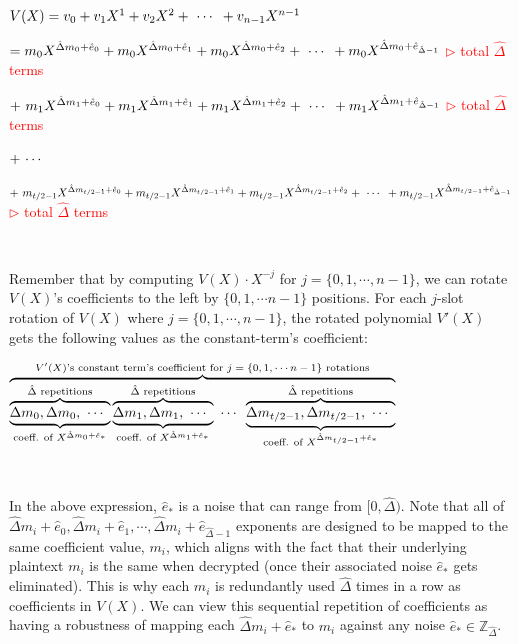 $ $

$V(X) = v_0 + v_1X^1 + v_2X^2 + \text{ } \text{$\cdots$} \text{ } + v_{n-1}X^{n-1}$

\text{ } $= m_0X^{\hat{\Delta} m_0 + \hat{e}_0} + m_0X^{\hat{\Delta} m_0 + \hat{e}_1} + m_0X^{\hat{\Delta} m_0 + \hat{e}_2} + \text{ } \text{$\cdots$} \text{ } +  m_0X^{\hat{\Delta} m_0 + \hat{e}_{\hat{\Delta} - 1}}$ \textcolor{red}{ $\rhd$ total $\hat{\Delta}$ terms}

\text{ } $ + \text{ } m_1X^{\hat{\Delta} m_1 + \hat{e}_0} + m_1X^{\hat{\Delta} m_1 + \hat{e}_1} + m_1X^{\hat{\Delta} m_1 + \hat{e}_2} + \text{ } \text{$\cdots$} \text{ } + m_1X^{\hat{\Delta} m_1 + \hat{e}_{\hat{\Delta} - 1}}$ \textcolor{red}{ $\rhd$ total $\hat{\Delta}$ terms}

\text{ } $ + \text{ } \text{$\cdots$} \text{ } $

\text{ } $ + \text{ } m_{t/2 - 1}X^{\hat{\Delta} m_{t/2 - 1} + \hat{e}_0} + m_{t/2 - 1}X^{\hat{\Delta} m_{t/2 - 1} + \hat{e}_1} + m_{t/2 - 1}X^{\hat{\Delta} m_{t/2 - 1} + \hat{e}_2} + \text{ } \text{$\cdots$} \text{ } + m_{t/2 - 1}X^{\hat{\Delta} m_{t/2 - 1} + \hat{e}_{\hat{\Delta} - 1}}$ \textcolor{red}{ $\rhd$ total $\hat{\Delta}$ terms}

$ $


Remember that by computing $V(X)\cdot X^{-j}$ for  $j= \{0, 1, \cdots , n-1\}$, we can rotate $V(X)$'s coefficients to the left by $\{0, 1, \cdots n-1 \}$ positions. For each $j$-slot rotation of $V(X)$ where $j= \{0, 1, \cdots , n-1\}$, the rotated polynomial $V'(X)$ gets the following values as the constant-term's coefficient: 

$\overbrace{\overbrace{\underbrace{\Delta m_0, \Delta m_0, \text{ } \text{$\cdots$} \text{ }}_{\text{coeff. of } X^{\hat{\Delta}m_0 + \hat{e}_*}}}^{\hat{\Delta} \text{ repetitions}} \overbrace{\underbrace{\Delta m_1, \Delta m_1, \text{ } \text{$\cdots$} \text{ }}_{\text{coeff. of } X^{\hat{\Delta}m_1 + \hat{e}_*}}}^{\hat{\Delta} \text{ repetitions}} \text{ } \text{$\cdots$} \text{ } \overbrace{\underbrace{\Delta m_{{t}/{2}-1}, \Delta m_{{t}/{2}-1}, \text{ } \text{$\cdots$} \text{ }}_{\text{coeff. of } X^{\hat{\Delta}m_{{t}/{2}-1}+ \hat{e}_*} }}^{\hat{\Delta} \text{ repetitions}}}^{\text{$V'(X)$'s constant term's coefficient for $j = \{0, 1, \cdots n-1\}$ rotations}}$ 



$ $

In the above expression, $\hat{e}_*$ is a noise that can range from $[0, \hat{\Delta})$. Note that all of $\hat\Delta m_i + \hat{e}_0, \hat\Delta m_i + \hat{e}_1, \cdots,\hat\Delta m_i + \hat{e}_{\hat\Delta - 1}$ exponents are designed to be mapped to the same coefficient value, $m_i$, which aligns with the fact that their underlying plaintext $m_i$ is the same when decrypted (once their associated noise $\hat{e}_*$ gets eliminated). This is why each $m_i$ is redundantly used $\hat\Delta$ times in a row as coefficients in $V(X)$. We can view this sequential repetition of coefficients as having a robustness of mapping each $\hat{\Delta}m_i + \hat{e}_*$ to $m_i$ against any noise $\hat{e}_* \in \mathbb{Z}_{\hat{\Delta}}$. 

